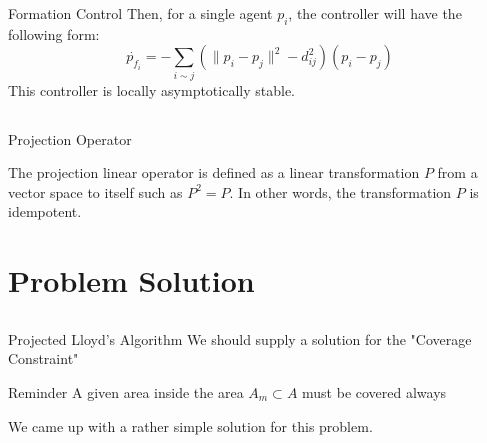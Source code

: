 \documentclass[t]{beamer}
\newcommand{\norm}[1]{\lVert #1 \rVert}
\begin{document}
\begin{frame}[label=distanceformation2]{Formation Control}
Then, for a single agent $p_i$, the controller will have the following form:
\begin{equation}
    \dot{p_{f_{i}}} = -\sum_{i \sim j} \left( \norm{p_{i} - p_{j}}^{2} - d_{ij}^2 \right) \left( p_{i} - p_{j} \right)
    \label{formation controller}
\end{equation}
This controller is locally asymptotically stable.
\end{frame}

\subsection[Projection Operator]{}
\begin{frame}[label=projoperator]{Projection Operator}

The projection linear operator is defined as a linear transformation $P$ from a vector space to itself such as $P^2 = P$. In other words, the transformation $P$ is idempotent.

\end{frame}


\section[Problem Solution]{Problem Solution}

\subsection[Projected Lloyd's Algorithm]{}
\begin{frame}[label=projlloydsalgo1]{Projected Lloyd's Algorithm}
We should supply a solution for the "Coverage Constraint" \pause
\begin{block}{Reminder}
A given area inside the area $A_{m} \subset A$ must be covered always
\end{block}\pause
We came up with a rather simple solution for this problem.
\end{frame}
\end{document}
